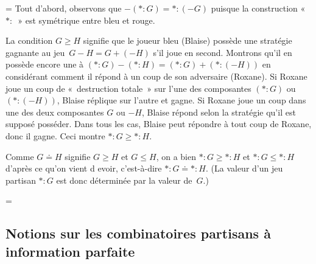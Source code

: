 \documentclass[12pt,a4paper]{article}
\theoremstyle{definition}
\newif\ifcorrige
\newenvironment{corrige}%
{\ifcorrige\relax\else\setbox0=\vbox\bgroup\fi%
\smallbreak\noindent{\underbar{\textit{Corrigé.}}\quad}}
{{\hbox{}\nobreak\hfill\checkmark}%
\ifcorrige\relax\else\egroup\fi\par}
\begin{document}
\begin{corrige}
Tout d'abord, observons que $-(*{:}G) = *{:}(-G)$ puisque la
construction « $*{:}$ » est symétrique entre bleu et rouge.

La condition $G\geq H$ signifie que le joueur bleu (Blaise) possède
une stratégie gagnante au jeu $G-H = G+(-H)$ s'il joue en second.
Montrons qu'il en possède encore une à $(*{:}G) - (*{:}H) = (*{:}G) +
(*{:}(-H))$ en considérant comment il répond à un coup de son
adversaire (Roxane).  Si Roxane joue un coup de « destruction totale »
sur l'une des composantes $(*{:}G)$ ou $(*{:}(-H))$, Blaise réplique
sur l'autre et gagne.  Si Roxane joue un coup dans une des deux
composantes $G$ ou $-H$, Blaise répond selon la stratégie qu'il est
supposé posséder.  Dans tous les cas, Blaise peut répondre à tout coup
de Roxane, donc il gagne.  Ceci montre $*{:}G \geq *{:}H$.

Comme $G\doteq H$ signifie $G\geq H$ et $G\leq H$, on a bien $*{:}G
\geq *{:}H$ et $*{:}G \leq *{:}H$ d'après ce qu'on vient d evoir,
c'est-à-dire $*{:}G \doteq *{:}H$.  (La valeur d'un jeu partisan
$*{:}G$ est donc déterminée par la valeur de $G$.)
\end{corrige}



=\vbox\bgroup
\subsection{Notions sur les combinatoires partisans à information parfaite}
\egroup



%
%
%

\printindex



%
%
%
\end{document}

